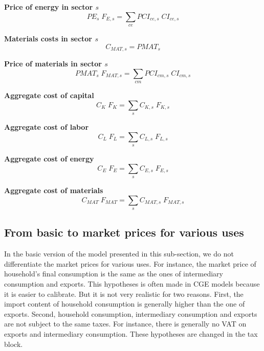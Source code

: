 \documentclass[12pt]{article}
\numberwithin{equation}{section}
\begin{document}
\noindent \textbf{Price of energy in sector $s$} 
\begin{dmath}
PE_{s} \; F_{E, s} = \sum_{ce} PCI_{ce, s} \; CI_{ce, s}
\label{prices.mdlPE[s]}
\end{dmath}

\noindent \textbf{Materials costs in sector $s$} 
\begin{dmath}
C_{MAT, s} = PMAT_{s}
\label{prices.mdlC[MAT, s]}
\end{dmath}

\noindent \textbf{Price of materials in sector $s$} 
\begin{dmath}
PMAT_{s} \; F_{MAT, s} = \sum_{cm} PCI_{cm, s} \; CI_{cm, s}
\label{prices.mdlPMAT[s]}
\end{dmath}

\noindent \textbf{Aggregate cost of capital} 
\begin{dmath}
C_{K} \; F_{K} = \sum_{s} C_{K, s} \; F_{K, s}
\label{prices.mdlC[K]}
\end{dmath}

\noindent \textbf{Aggregate cost of labor} 
\begin{dmath}
C_{L} \; F_{L} = \sum_{s} C_{L, s} \; F_{L, s}
\label{prices.mdlC[L]}
\end{dmath}

\noindent \textbf{Aggregate cost of energy} 
\begin{dmath}
C_{E} \; F_{E} = \sum_{s} C_{E, s} \; F_{E, s}
\label{prices.mdlC[E]}
\end{dmath}

\noindent \textbf{Aggregate cost of materials} 
\begin{dmath}
C_{MAT} \; F_{MAT} = \sum_{s} C_{MAT, s} \; F_{MAT, s}
\label{prices.mdlC[MAT]}
\end{dmath}




\subsection{From basic to market prices for various uses}



In the basic version of the model presented in this sub-section, we do not differentiate the market prices for various uses. For instance, the market price of household's final consumption is the same as the ones of intermediary consumption and exports. This hypotheses is often made in CGE models because it is easier to calibrate. But it is not very realistic for two reasons. First, the import content of household consumption is generally higher than the one of exports. Second, household consumption, intermediary consumption and exports are not subject to the same taxes. For instance, there is generally no VAT on exports and intermediary consumption. These hypotheses are changed in the tax block. \\
\end{document}
